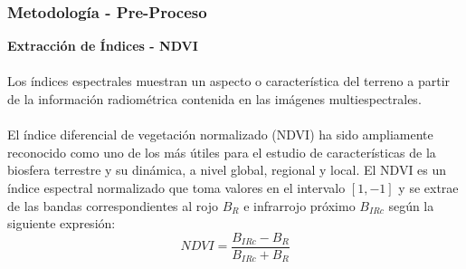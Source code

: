 \documentclass[xcolor=table]{beamer}
\begin{document}
\begin{frame}
	\frametitle{Metodolog\'ia - Pre-Proceso}
	\textbf{Extracci\'on de \'Indices - NDVI}\\~\\	
	Los \'indices espectrales muestran un aspecto o caracter\'istica del terreno a partir de la informaci\'on radiom\'etrica contenida en las im\'agenes multiespectrales.\\~\\
	El \'indice diferencial de vegetaci\'on normalizado (NDVI) ha sido ampliamente reconocido como uno de los m\'as \'utiles para el estudio de caracter\'isticas de la biosfera terrestre y su din\'amica, a nivel global, regional y local. El NDVI es un \'indice espectral normalizado que toma valores en el intervalo $[1,-1]$ y se extrae de las bandas correspondientes al rojo $B_{R}$ e infrarrojo pr\'oximo $B_{IRc}$ seg\'un la siguiente expresi\'on:
	\begin{equation}
	NDVI=\dfrac{B_{IRc}-B_{R}}{B_{IRc}+B_{R}}
	\end{equation}
	
\end{frame}
\end{document}
